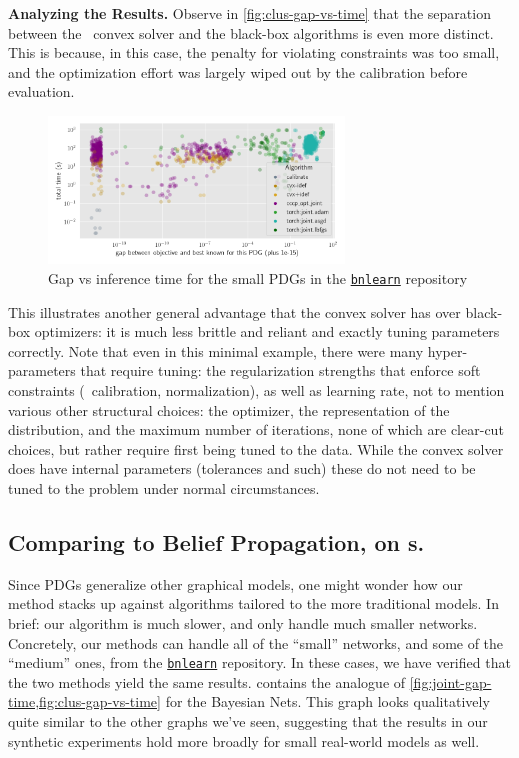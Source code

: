 \begin{subappendices}
\textbf{Analyzing the Results.}
Observe in \cref{fig:clus-gap-vs-time} that the separation between the \actree\ convex solver and the black-box algorithms is even more distinct. This is because, in this case, the penalty for violating constraints was too small, and the optimization effort was largely wiped out by the calibration before evaluation.


\begin{figure}
    \centering
    \includegraphics[width=0.7\textwidth]{figs/bn/gap-v-time}
    \caption{Gap vs inference time for the small PDGs in the \href{https://www.bnlearn.com/bnrepository/}{\texttt{bnlearn}} repository}
    \label{fig:bn-gap-v-time}
\end{figure}

This illustrates another general advantage that the convex solver has over black-box optimizers: it is much less brittle and reliant and exactly tuning parameters correctly. Note that even in this minimal example, there were many hyper-parameters that require tuning:
the regularization strengths that enforce soft constraints (\actree\ calibration, normalization), as well as learning rate, not to mention
various other structural choices: the optimizer, the representation of the distribution, and the maximum number of iterations, none of which are clear-cut choices, but rather require first being tuned to the data.
While the convex solver does have internal parameters (tolerances and such) these do not need to be tuned to the problem under normal circumstances.

\subsection{Comparing to Belief Propagation, on \AcTree s.}
    \label{sec:bn-expt-details}
 Since PDGs generalize other graphical models, one might wonder how our method stacks up against algorithms tailored to the more traditional models. In brief: our algorithm is much slower, and only handle much smaller networks.
 Concretely, our methods can handle all of the ``small'' networks, and some of the ``medium'' ones, from the \href{https://www.bnlearn.com/bnrepository/}{\texttt{bnlearn}} repository.
  In these cases, we have verified that the two methods yield the same results.
   contains the analogue of \cref{fig:joint-gap-time,fig:clus-gap-vs-time}
  for the Bayesian Nets. This graph looks qualitatively quite similar to the other graphs we've seen, suggesting that the results in our synthetic experiments hold more broadly for small real-world models as well.





\end{subappendices}
